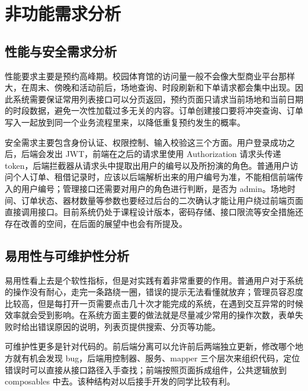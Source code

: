 \section{非功能需求分析}

\subsection{性能与安全需求分析}

性能要求主要是预约高峰期。校园体育馆的访问量一般不会像大型商业平台那样大，在周末、傍晚和活动前后，场地查询、时段刷新和下单请求都会集中出现。因此系统需要保证常用列表接口可以分页返回，预约页面只请求当前场地和当前日期的时段数据，避免一次性加载过多无关的内容。订单创建接口要将冲突查询、订单写入一起放到同一个业务流程里来，以降低重复预约发生的概率。

安全需求主要包含身份认证、权限控制、输入校验这三个方面。用户登录成功之后，后端会发出 JWT，前端在之后的请求里使用 Authorization 请求头传递 token，后端拦截器从请求头中提取出用户的编号以及所扮演的角色。普通用户访问个人订单、租借记录时，应该以后端解析出来的用户编号为准，不能相信前端传入的用户编号；管理接口还需要对用户的角色进行判断，是否为 admin。场地时间、订单状态、器材数量等参数也要经过后台的二次确认才能让用户绕过前端页面直接调用接口。目前系统仍处于课程设计版本，密码存储、接口限流等安全措施还存在改善的空间，在后面的展望中也会有所提及。

\subsection{易用性与可维护性分析}

易用性看上去是个软性指标，但是对实践有着非常重要的作用。普通用户对于系统的操作没有耐心，走完一条路绕一圈，错误的提示无法看懂就放弃；管理员容忍度比较高，但是每打开一页需要点击几十次才能完成的系统，在遇到交互异常的时候效率就会受到影响。在系统方面主要的做法就是尽量减少常用的操作次数，表单失败时给出错误原因的说明，列表页提供搜索、分页等功能。

可维护性更多是针对代码的。前后端分离可以允许前后两端独立更新，修改哪个地方就有机会发现 bug，后端用控制器、服务、mapper 三个层次来组织代码，定位错误时可以直接从接口路径入手查找；前端按照页面拆成组件，公共逻辑放到 composables 中去。该种结构对以后接手开发的同学比较有利。

